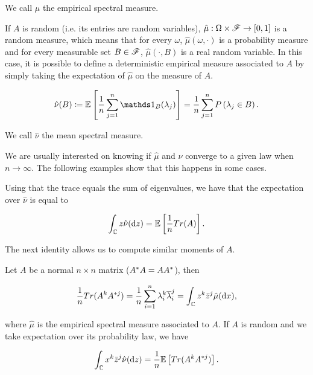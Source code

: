 We call $\hat\mu$ the empirical spectral measure. 

If $A$ is random (i.e. its entries are random variables), $\hat\mu:\Omega \times \mathscr F \to [0,1]$ is a random measure, which means that for every $\omega$, $\hat\mu(\omega, \cdot)$ is a probability measure and for every measurable set $B\in\mathscr F$, $\hat\mu(\cdot,B)$ is a real random variable. In this case, it is possible to define a deterministic empirical measure associated to $A$ by simply taking the expectation of $\hat\mu$ on the measure of $A$.

\begin{equation*}
    \hat\nu(B) \coloneqq \E{ \frac1n \sum_{j=1}^n \mathds 1_B(\lambda_j) } = \frac1n \sum_{j=1}^n \P{\lambda_j \in B}.
\end{equation*}

We call $\hat\nu$ the mean spectral measure. 

We are usually interested on knowing if $\hat\mu$ and $\hat \nu$ converge to a given law when $n\to\infty$. The following examples show that this happens in some cases.

\begin{example} 
\end{example}

Using that the trace equals the sum of eigenvalues, we have that the expectation over  $\hat\nu$ is equal to

\begin{equation*}
    \int_\mathbb C z \hat\nu(\mathrm d z) = \mathbb E \left[  \frac1n Tr(A)  \right].
\end{equation*}

The next identity allows us to compute similar moments of $A$.

\begin{theorem}
    Let $A$ be a normal $n\times n$ matrix ($A^*A = AA^*$), then 

    \begin{equation*}
        \frac1n Tr(A^k A^{*j}) = \frac1n \sum_{i=1}^n \lambda_i^k \overline{\lambda}_i^j = \int_\mathbb C z^k \bar{z}^j \hat\mu(\mathrm d x),
    \end{equation*}

    \noindent where $\hat\mu$ is the empirical spectral measure associated to $A$. If $A$ is random and we take expectation over its probability law, we have

    \begin{equation*}
        \int_\mathbb C x^k \bar{z}^j \hat\nu(\mathrm d z) = \frac1n \mathbb E \left[  Tr(A^k A^{*j})  \right].
    \end{equation*}
\end{theorem}

